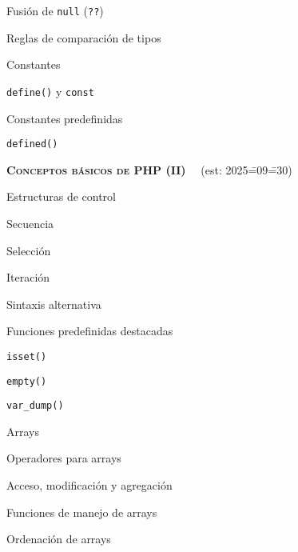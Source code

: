 \begin{longenum}
\begin{longenum}
\begin{longenum}
\begin{longenum}
                \item Fusión de \texttt{null} (\texttt{??})
                \item Reglas de comparación de tipos
            \end{longenum}
        \end{longenum}
        \item Constantes
        \begin{longenum}
            \item \texttt{define()} y \texttt{const}
            \item Constantes predefinidas
            \item \texttt{defined()}
        \end{longenum}
    \end{longenum}
    \item \textbf{\textsc{Conceptos básicos de PHP (II)}} \ \ (est: 2025\==09\==30)
    \begin{longenum}
        \item Estructuras de control
        \begin{longenum}
            \item Secuencia
            \item Selección
            \item Iteración
            \item Sintaxis alternativa
        \end{longenum}
        \item Funciones predefinidas destacadas
        \begin{longenum}
            \item \texttt{isset()}
            \item \texttt{empty()}
            \item \texttt{var\_dump()}
        \end{longenum}
        \item Arrays
        \begin{longenum}
            \item Operadores para arrays
            \begin{longenum}
                \item Acceso, modificación y agregación
            \end{longenum}
            \item Funciones de manejo de arrays
            \begin{longenum}
                \item Ordenación de arrays

\end{longenum}
\end{longenum}
\end{longenum}
\end{longenum}
